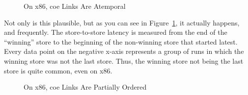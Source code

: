 \documentclass[10]{article}
\begin{document}
\begin{figure}[tb]
\begin{center}
\caption{On x86, coe Links Are Atemporal}
\label{fig:On x86; coe Links Are Atemporal}
\end{center}
\end{figure}

Not only is this plausible, but as you can see in
Figure~\ref{fig:On x86; coe Links Are Atemporal},
it actually happens, and frequently.
The store-to-store latency is measured from the end of the ``winning''
store to the beginning of the non-winning store that started latest.
Every data point on the negative x-axis represents a group of runs
in which the winning store was not the last store.
Thus, the winning store not being the last store is quite common, even
on x86.

\begin{figure}[tb]
\begin{center}
\caption{On x86, coe Links Are Partially Ordered}
\label{fig:On x86, coe Links Are Partially Ordered}
\end{center}
\end{figure}
\end{document}
